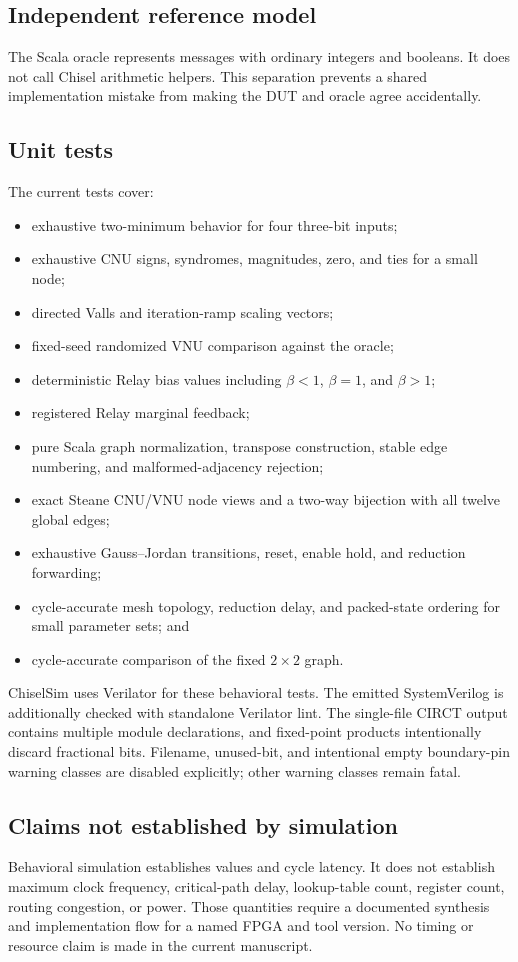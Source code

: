 \documentclass[10pt,conference]{IEEEtran}
\begin{document}
\subsection{Independent reference model}
The Scala oracle represents messages with ordinary integers and booleans.  It
does not call Chisel arithmetic helpers.  This separation prevents a shared
implementation mistake from making the DUT and oracle agree accidentally.

\subsection{Unit tests}
The current tests cover:
\begin{itemize}
  \item exhaustive two-minimum behavior for four three-bit inputs;
  \item exhaustive CNU signs, syndromes, magnitudes, zero, and ties for a small node;
  \item directed Valls and iteration-ramp scaling vectors;
  \item fixed-seed randomized VNU comparison against the oracle;
  \item deterministic Relay bias values including $\beta<1$, $\beta=1$, and $\beta>1$;
  \item registered Relay marginal feedback;
  \item pure Scala graph normalization, transpose construction, stable edge
        numbering, and malformed-adjacency rejection;
  \item exact Steane CNU/VNU node views and a two-way bijection with all twelve
        global edges;
  \item exhaustive Gauss--Jordan transitions, reset, enable hold, and
        reduction forwarding;
  \item cycle-accurate mesh topology, reduction delay, and packed-state
        ordering for small parameter sets; and
  \item cycle-accurate comparison of the fixed $2\times2$ graph.
\end{itemize}
ChiselSim uses Verilator for these behavioral tests.  The emitted
SystemVerilog is additionally checked with standalone Verilator lint.  The
single-file CIRCT output contains multiple module declarations, and fixed-point
products intentionally discard fractional bits.  Filename, unused-bit, and
intentional empty boundary-pin warning classes are disabled explicitly; other
warning classes remain fatal.

\subsection{Claims not established by simulation}
Behavioral simulation establishes values and cycle latency.  It does not
establish maximum clock frequency, critical-path delay, lookup-table count,
register count, routing congestion, or power.  Those quantities require a
documented synthesis and implementation flow for a named FPGA and tool
version.  No timing or resource claim is made in the current manuscript.
\end{document}
